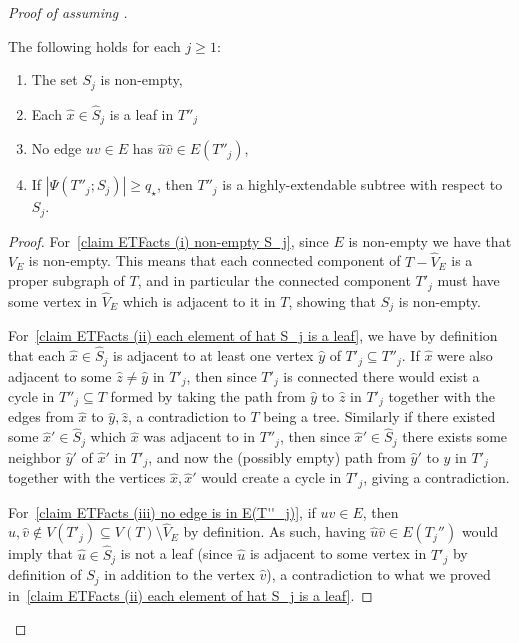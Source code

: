 \documentclass[10pt,a4paper]{amsart}
\newcommand{\Pow}{{q_\star}} %
\newcommand{\sm}{\setminus}
\newcommand{\sub}{\subseteq}
\begin{document}
\begin{proof}[Proof of  assuming ]
		\begin{claim}\label{cl:ETFacts}
			The following holds for each $j\ge 1$:
			\begin{enumerate}[label=(\roman*)]
				\item The set $S_j$ is non-empty,\label{claim ETFacts (i) non-empty S_j}
				\item Each $\hat{x}\in \widehat{S}_j$ is a leaf in $T''_j$\label{claim ETFacts (ii) each element of hat S_j is a leaf}
				\item No edge $uv\in E$ has $\hat{u}\hat{v}\in E(T''_j)$,\label{claim ETFacts (iii) no edge is in E(T''_j)}
				\item If $|\Psi(T''_j;S_j)|\ge \Pow$, then $T''_j$ is a highly-extendable subtree with respect to $S_j$.\label{claim ETFacts (iv) highly extentable}
			\end{enumerate}
		\end{claim}
		\begin{proof}
			For~\ref{claim ETFacts (i) non-empty S_j}, since $E$ is non-empty we have that $V_E$ is non-empty.  This means that each connected component of $T-\widehat{V}_E$ is a proper subgraph of $T$, and in particular the connected component $T'_j$ must have some vertex in $\widehat{V}_E$ which is adjacent to it in $T$, showing that $S_j$ is non-empty. 
			
			
			For~\ref{claim ETFacts (ii) each element of hat S_j is a leaf}, we have by definition that each $\hat{x}\in \widehat{S}_j$ is adjacent to at least one vertex $\hat{y}$ of $T'_j\sub T''_j$.  If $\hat{x}$ were also adjacent to some $\hat{z}\ne \hat{y}$ in $T'_j$, then since $T'_j$ is connected there would exist a cycle in $T''_j\sub T$ formed by taking the path from $\hat{y}$ to $\hat{z}$ in $T'_j$ together with the edges from $\hat{x}$ to $\hat{y},\hat{z}$, a contradiction to $T$ being a tree.  Similarly if there existed some $\hat{x}'\in \widehat{S}_j$ which $\hat{x}$ was adjacent to in $T''_j$, then since $\hat{x}'\in \widehat{S}_j$ there exists some neighbor $\hat{y}'$ of $\hat{x}'$ in $T'_j$, and now the (possibly empty) path from $\hat{y}'$ to $\hat{y}$ in $T'_j$ together with the vertices $\hat{x},\hat{x}'$ would create a cycle in $T'_j$, giving a contradiction.
			
			
			
			For~\ref{claim ETFacts (iii) no edge is in E(T''_j)}, if $uv\in E$, then $\hat{u},\hat{v}\not\in V(T'_j)\sub V(T)\sm \widehat{V}_E$ by definition.  As such, having $\hat{u}\hat{v}\in E(T_j'')$ would imply that $\hat{u}\in \widehat{S}_j$ is not a leaf (since $\hat{u}$ is adjacent to some vertex in $T'_j$ by definition of $S_j$ in addition to the vertex $\hat{v}$), a contradiction to what we proved in~\ref{claim ETFacts (ii) each element of hat S_j is a leaf}.
			

\end{proof}
\end{proof}
\end{document}
